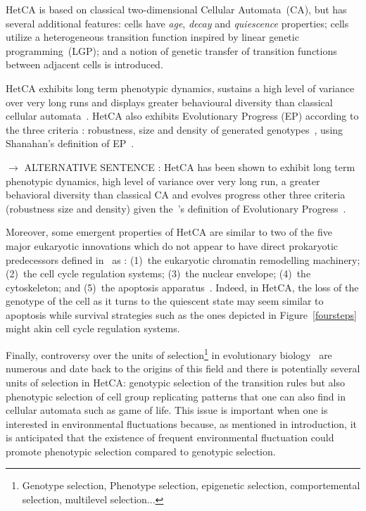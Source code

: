 HetCA is based on classical two-dimensional Cellular Automata~(CA), but has several additional features: cells have \emph{age}, \emph{decay} and \emph{quiescence} properties; cells utilize a heterogeneous transition function inspired by linear genetic programming~(LGP); and  a notion of genetic transfer of transition functions between adjacent cells is introduced.

HetCA exhibits long term phenotypic dynamics, sustains a high level of variance over very long runs and displays greater behavioural diversity than classical cellular automata~\citep{medernach2013long}. HetCA also exhibits Evolutionary Progress (EP) according to the three criteria : robustness, size and density of generated genotypes~\citep{medernach2015evolutionary}, using Shanahan's definition of EP~\citep{shanahan2012evolutionary}.

$\rightarrow$ ALTERNATIVE SENTENCE : HetCA has been shown to exhibit long term phenotypic dynamics, high level of variance over very long run, a greater behavioral diversity than classical CA and evolves progress other three criteria (robustness size and density) given the~\cite{shanahan2012evolutionary}'s definition of Evolutionary Progress~\citep{medernach2015evolutionary}.

Moreover, some emergent properties of HetCA are similar to two of the five major eukaryotic innovations which do not appear to have direct prokaryotic predecessors defined in~\citep{smith1997major} as : (1)~the eukaryotic chromatin remodelling machinery; (2)~the cell cycle regulation systems; (3)~the nuclear envelope; (4)~the cytoskeleton; and (5)~the apoptosis apparatus~\citep{koonin2002origin}. Indeed, in HetCA, the loss of the genotype of the cell as it turns to the quiescent state may seem similar to apoptosis while survival strategies such as the ones depicted in Figure~\ref{foursteps} might akin cell cycle regulation systems.

Finally, controversy over the units of selection\footnote{Genotype selection, Phenotype selection, epigenetic selection, comportemental selection, multilevel selection...} in evolutionary biology~\citep{okasha2006evolution} are numerous and date back to the origins of this field  and there is potentially several units of selection in HetCA: genotypic selection of the transition rules but also phenotypic selection of cell group replicating patterns that one can also find in cellular automata such as game of life.  This issue is important when one is interested in environmental fluctuations because, as mentioned in introduction, it is anticipated that the existence of frequent environmental fluctuation could promote phenotypic selection compared to genotypic selection.


